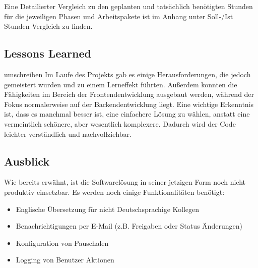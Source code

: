 Eine Detailierter Vergleich zu den geplanten und tatsächlich benötigten Stunden für die jeweiligen Phasen und Arbeitspakete ist im Anhang unter Soll-/Ist Stunden Vergleich zu finden. \todo

\subsection{Lessons Learned}
\label{sec:Abschlussphase:Lessons Learned}
\todo umschreiben
Im Laufe des Projekts gab es einige Herausforderungen, die jedoch gemeistert wurden und zu einem Lerneffekt führten. Außerdem konnten die Fähigkeiten im Bereich der Frontendentwicklung ausgebaut werden, während der Fokus normalerweise auf der Backendentwicklung liegt. Eine wichtige Erkenntnis ist, dass es manchmal besser ist, eine einfachere Lösung zu wählen, anstatt eine vermeintlich schönere, aber wesentlich komplexere. Dadurch wird der Code leichter verständlich und nachvollziehbar.

\subsection{Ausblick}
\label{sec:Abschlussphase:Ausblick}
Wie bereits erwähnt, ist die Softwarelösung in seiner jetzigen Form noch nicht produktiv einsetzbar. Es werden noch einige Funktionalitäten benötigt:

\begin{itemize}
    \item Englische Übersetzung für nicht Deutschsprachige Kollegen
    \item Benachrichtigungen per E-Mail (z.B. Freigaben oder Status Änderungen)
    \item Konfiguration von Pauschalen
    \item Logging von Benutzer Aktionen
\end{itemize}
